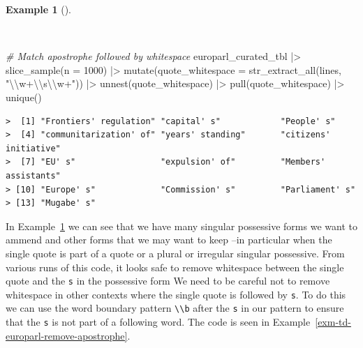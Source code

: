 \documentclass[
  letterpaper,
  DIV=11,
  numbers=noendperiod]{scrreport}
\newenvironment{Shaded}{\begin{snugshade}}{\end{snugshade}}
\newcommand{\AttributeTok}[1]{\textcolor[rgb]{0.00,0.00,0.00}{#1}}
\newcommand{\CommentTok}[1]{\textcolor[rgb]{0.00,0.00,0.00}{\textit{#1}}}
\newcommand{\DecValTok}[1]{\textcolor[rgb]{0.00,0.00,0.00}{#1}}
\newcommand{\FunctionTok}[1]{\textcolor[rgb]{0.00,0.00,0.00}{#1}}
\newcommand{\NormalTok}[1]{\textcolor[rgb]{0.00,0.00,0.00}{#1}}
\newcommand{\SpecialCharTok}[1]{\textcolor[rgb]{0.00,0.00,0.00}{#1}}
\newcommand{\StringTok}[1]{\textcolor[rgb]{0.00,0.00,0.00}{#1}}
\theoremstyle{definition}
\newtheorem{example}{Example}[chapter]
\theoremstyle{remark}
\begin{document}
\begin{example}[]\protect\hypertarget{exm-td-europarl-search-apostrophe}{}\label{exm-td-europarl-search-apostrophe}

~

\begin{Shaded}
\begin{Highlighting}[]
\CommentTok{\# Match apostrophe followed by whitespace}
\NormalTok{europarl\_curated\_tbl }\SpecialCharTok{|\textgreater{}}
  \FunctionTok{slice\_sample}\NormalTok{(}\AttributeTok{n =} \DecValTok{1000}\NormalTok{) }\SpecialCharTok{|\textgreater{}} 
  \FunctionTok{mutate}\NormalTok{(}\AttributeTok{quote\_whitespace =} \FunctionTok{str\_extract\_all}\NormalTok{(lines, }\StringTok{"}\SpecialCharTok{\textbackslash{}\textbackslash{}}\StringTok{w+\textquotesingle{}}\SpecialCharTok{\textbackslash{}\textbackslash{}}\StringTok{s}\SpecialCharTok{\textbackslash{}\textbackslash{}}\StringTok{w+"}\NormalTok{)) }\SpecialCharTok{|\textgreater{}} 
  \FunctionTok{unnest}\NormalTok{(quote\_whitespace) }\SpecialCharTok{|\textgreater{}}
  \FunctionTok{pull}\NormalTok{(quote\_whitespace) }\SpecialCharTok{|\textgreater{}}
  \FunctionTok{unique}\NormalTok{()}
\end{Highlighting}
\end{Shaded}

\begin{verbatim}
>  [1] "Frontiers' regulation" "capital' s"            "People' s"            
>  [4] "communitarization' of" "years' standing"       "citizens' initiative" 
>  [7] "EU' s"                 "expulsion' of"         "Members' assistants"  
> [10] "Europe' s"             "Commission' s"         "Parliament' s"        
> [13] "Mugabe' s"
\end{verbatim}

\end{example}

In Example~\ref{exm-td-europarl-search-apostrophe} we can see that we
have many singular possessive forms we want to ammend and other forms
that we may want to keep --in particular when the single quote is part
of a quote or a plural or irregular singular possessive. From various
runs of this code, it looks safe to remove whitespace between the single
quote and the \texttt{s} in the possessive form We need to be careful
not to remove whitespace in other contexts where the single quote is
followed by \texttt{s}. To do this we can use the word boundary pattern
\texttt{\textbackslash{}\textbackslash{}b} after the \texttt{s} in our
pattern to ensure that the \texttt{s} is not part of a following word.
The code is seen in Example~\ref{exm-td-europarl-remove-apostrophe}.
\end{document}
